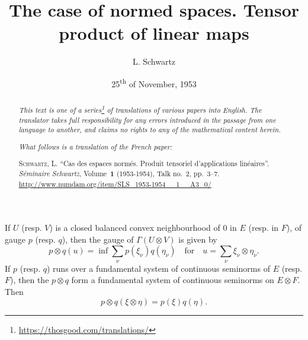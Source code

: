 \documentclass{article}
\title{The case of normed spaces. Tensor product of linear maps}
\author{L. Schwartz}
\date{25\textsuperscript{th} of November, 1953}
\theoremstyle{plain}
\newenvironment{proposition}[1]
    {\renewcommand\theinnercustomproposition{#1}\innercustomproposition}
    {\endinnercustomproposition}
\theoremstyle{definition}
\newcommand{\oldpage}[1]{\marginpar{\phantom{.}\\\footnotesize$\Big\vert$ \textit{p.~#1}}}
\begin{document}
\maketitle
\thispagestyle{fancy}

\renewcommand{\abstractname}{Translator's note.}

\begin{abstract}
  \renewcommand*{\thefootnote}{\fnsymbol{footnote}}
  \emph{This text is one of a series\footnote{\url{https://thosgood.com/translations/}} of translations of various papers into English.}
  \emph{The translator takes full responsibility for any errors introduced in the passage from one language to another, and claims no rights to any of the mathematical content herein.}
  
  \emph{What follows is a translation of the French paper:}

  \medskip\noindent
  \textsc{Schwartz, L.}
  ``Cas des espaces norm\'{e}s. Produit tensoriel d'applications lin\'{e}aires''.
  \emph{S\'{e}minaire Schwartz}, Volume~\textbf{1} (1953-1954), Talk no.~2, pp.~3--7.
  {\footnotesize\url{http://www.numdam.org/item/SLS_1953-1954__1__A3_0/}}
\end{abstract}

\setcounter{footnote}{0}



\oldpage{3}
\begin{proposition}{1}
  If $U$ (resp. $V$) is a closed balanced convex neighbourhood of $0$ in $E$ (resp. in $F$), of gauge $p$ (resp. $q$), then the gauge of $\Gamma(U\otimes V)$ is given by
  \[
  \label{equation1}
    p\otimes q(u) = \inf\sum_\nu p(\xi_\nu)q(\eta_\nu)
    \quad\text{for}\quad
    u=\sum_\nu\xi_\nu\otimes\eta_\nu.
  \tag{1}
  \]
  If $p$ (resp. $q$) runs over a fundamental system of continuous seminorms of $E$ (resp. $F$), then the $p\otimes q$ form a fundamental system of continuous seminorms on $E\otimes F$.
  Then
  \[
  \label{equation2}
    p\otimes q(\xi\otimes\eta) = p(\xi)q(\eta).
  \tag{2}
  \]
\end{proposition}
\end{document}
